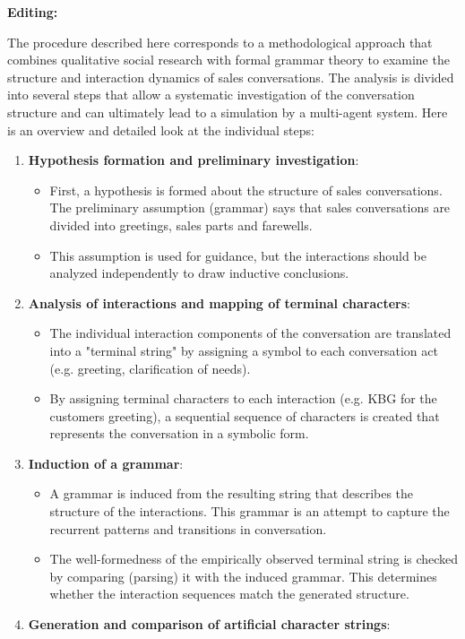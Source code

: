 \documentclass[
]{article}
\begin{document}
\textbf{Editing:}

The procedure described here corresponds to a methodological approach
that combines qualitative social research with formal grammar theory to
examine the structure and interaction dynamics of sales conversations.
The analysis is divided into several steps that allow a systematic
investigation of the conversation structure and can ultimately lead to a
simulation by a multi-agent system. Here is an overview and detailed
look at the individual steps:

\begin{enumerate}
\def\labelenumi{\arabic{enumi}.}
\item
  \textbf{Hypothesis formation and preliminary investigation}:

  \begin{itemize}
  \item
    First, a hypothesis is formed about the structure of sales
    conversations. The preliminary assumption (grammar) says that sales
    conversations are divided into greetings, sales parts and farewells.
  \item
    This assumption is used for guidance, but the interactions should be
    analyzed independently to draw inductive conclusions.
  \end{itemize}
\item
  \textbf{Analysis of interactions and mapping of terminal characters}:

  \begin{itemize}
  \item
    The individual interaction components of the conversation are
    translated into a "terminal string" by assigning a symbol to each
    conversation act (e.g. greeting, clarification of needs).
  \item
    By assigning terminal characters to each interaction (e.g. KBG for
    the customer\textquotesingle s greeting), a sequential sequence of
    characters is created that represents the conversation in a symbolic
    form.
  \end{itemize}
\item
  \textbf{Induction of a grammar}:

  \begin{itemize}
  \item
    A grammar is induced from the resulting string that describes the
    structure of the interactions. This grammar is an attempt to capture
    the recurrent patterns and transitions in conversation.
  \item
    The well-formedness of the empirically observed terminal string is
    checked by comparing (parsing) it with the induced grammar. This
    determines whether the interaction sequences match the generated
    structure.
  \end{itemize}
\item
  \textbf{Generation and comparison of artificial character strings}:


\end{enumerate}
\end{document}
